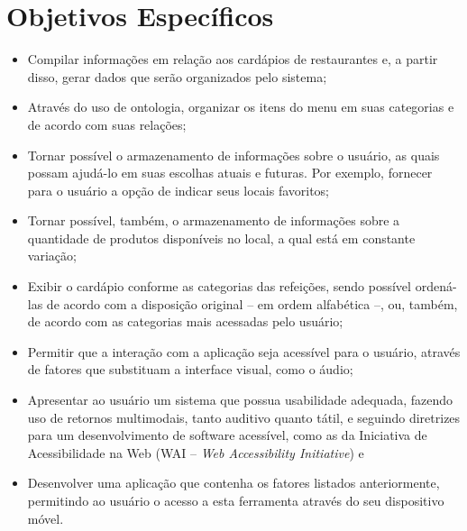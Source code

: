 \section{Objetivos Específicos}
\begin{itemize}
    \item Compilar informações em relação aos cardápios de restaurantes e, a partir disso, gerar dados que serão organizados pelo sistema;
    \item Através do uso de ontologia, organizar os itens do menu em suas categorias e de acordo com suas relações;
    \item Tornar possível o armazenamento de informações sobre o usuário, as quais possam ajudá-lo em suas escolhas atuais e futuras. Por exemplo, fornecer para o usuário a opção de indicar seus locais favoritos;
    \item Tornar possível, também, o armazenamento de informações sobre a quantidade de produtos disponíveis no local, a qual está em constante variação;
    \item Exibir o cardápio conforme as categorias das refeições, sendo possível ordená-las de acordo com a disposição original -- em ordem alfabética --, ou, também, de acordo com as categorias mais acessadas pelo usuário;
    \item Permitir que a interação com a aplicação seja acessível para o usuário, através de fatores que substituam a interface visual, como o áudio;
    \item Apresentar ao usuário um sistema que possua usabilidade adequada, fazendo uso de retornos multimodais, tanto auditivo quanto tátil, e seguindo diretrizes para um desenvolvimento de software acessível, como as da Iniciativa de Acessibilidade na Web (WAI -- \emph{Web Accessibility Initiative}) e
    \item Desenvolver uma aplicação que contenha os fatores listados anteriormente, permitindo ao usuário o acesso a esta ferramenta através do seu dispositivo móvel.
\end{itemize}